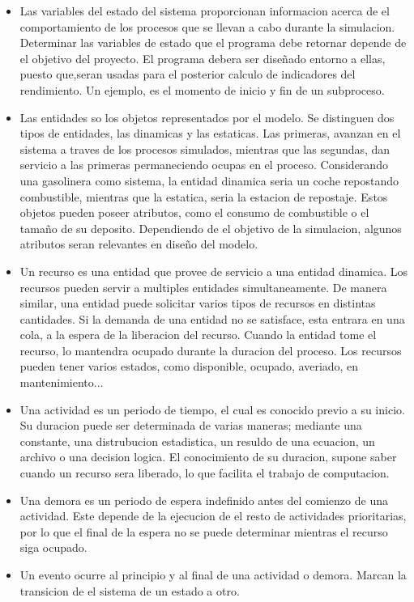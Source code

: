 \begin{itemize}
	\item Las variables del estado del sistema proporcionan informacion
		acerca de el comportamiento de los procesos
		que se llevan a cabo durante la simulacion.
		Determinar las variables de estado que el programa debe retornar
		depende de el objetivo del proyecto.
		El programa debera ser diseñado entorno a ellas,
		puesto que,seran usadas
		para el posterior calculo de indicadores del rendimiento.
		Un ejemplo, es el momento de inicio y fin de un subproceso.

	\item Las entidades so los objetos representados por el modelo.
		Se distinguen dos tipos de entidades,
		las dinamicas y las estaticas.
		Las primeras, avanzan en el sistema
		a traves de los procesos simulados, 
		mientras que las segundas, dan servicio a las primeras
		permaneciendo ocupas en el proceso.
		Considerando una gasolinera como sistema,
		la entidad dinamica seria un coche repostando combustible,
		mientras que la estatica, seria la estacion de repostaje.
		Estos objetos pueden poseer atributos,
		como el consumo de combustible o el tamaño de su deposito.
		Dependiendo de el objetivo de la simulacion,
		algunos atributos seran relevantes en diseño del modelo.
	\item Un recurso es una entidad
		que provee de servicio a una entidad dinamica.
		Los recursos pueden servir a multiples entidades simultaneamente.
		De manera similar, una entidad puede
		solicitar varios tipos de recursos en distintas cantidades.
		Si la demanda de una entidad no se satisface,
		esta entrara en una cola,
		a la espera de la liberacion del recurso.
		Cuando la entidad tome el recurso,
		lo mantendra ocupado durante la duracion del proceso.
		Los recursos pueden tener varios estados,
		como disponible, ocupado, averiado, en mantenimiento...
	\item Una actividad es un periodo de tiempo,
		el cual es conocido previo a su inicio.
		Su duracion puede ser determinada de varias maneras;
		mediante una constante, una distrubucion estadistica,
		un resuldo de una ecuacion, un archivo o una decision logica.
		El conocimiento de su duracion,
		supone saber cuando un recurso sera liberado,
		lo que facilita el trabajo de computacion.
	\item Una demora es un periodo de espera indefinido
		antes del comienzo de una actividad.
		Este depende de la ejecucion
		de el resto de actividades prioritarias,
		por lo que el final de la espera no se puede determinar
		mientras el recurso siga ocupado.
	\item Un evento ocurre al principio y al final de una actividad o demora.
		Marcan la transicion de el sistema de un estado a otro.
\end{itemize}

